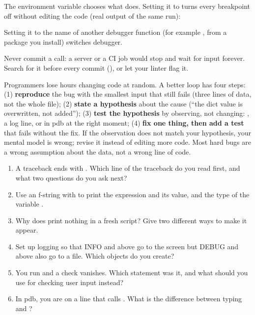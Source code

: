The environment variable  chooses what  does. Setting it to  turns every breakpoint off
without editing the code (real output of the same run):


Setting it to the name of another debugger function (for example , from a package you install) switches debugger.

\begin{trap}
Never commit a  call: a server or a CI job would stop and wait for input forever. Search for it before every commit
(), or let your linter flag it.
\end{trap}

\begin{boss}
Programmers lose hours changing code at random. A better loop has four steps:
(1) \textbf{reproduce} the bug with the smallest input that still fails (three lines of data, not the whole file);
(2) \textbf{state a hypothesis} about the cause (``the dict value is overwritten, not added'');
(3) \textbf{test the hypothesis} by observing, not changing: , a log line, or  in pdb at the right moment;
(4) \textbf{fix one thing, then add a test} that fails without the fix. If the observation does not match your hypothesis, your mental model is wrong;
revise it instead of editing more code. Most hard bugs are a wrong assumption about the data, not a wrong line of code.
\end{boss}

\begin{practice}
\begin{enumerate}[leftmargin=*,itemsep=2pt]
\item A traceback ends with . Which line of the traceback do you read first, and what two questions do you ask next?
\item Use an f-string with \code{=} to print the expression  and its value, and the type of the variable .
\item Why does  print nothing in a fresh script? Give two different ways to make it appear.
\item Set up logging so that INFO and above go to the screen but DEBUG and above also go to a file. Which objects do you create?
\item You run  and a check vanishes. Which statement was it, and what should you use for checking user input instead?
\item In pdb, you are on a line that calls . What is the difference between typing  and ?
\end{enumerate}
\end{practice}

